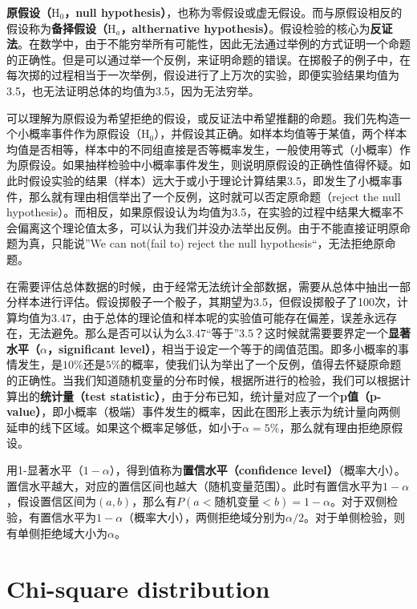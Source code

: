 \documentclass[11pt]{article}
\begin{document}
\textbf{原假设（$\text{H}_0$，null hypothesis）}，也称为零假设或虚无假设。而与原假设相反的假设称为\textbf{备择假设（$\text{H}_a$，althernative hypothesis）}。假设检验的核心为\textbf{反证法}。在数学中，由于不能穷举所有可能性，因此无法通过举例的方式证明一个命题的正确性。但是可以通过举一个反例，来证明命题的错误。在掷骰子的例子中，在每次掷的过程相当于一次举例，假设进行了上万次的实验，即便实验结果均值为3.5，也无法证明总体的均值为3.5，因为无法穷举。

可以理解为原假设为希望拒绝的假设，或反证法中希望推翻的命题。我们先构造一个小概率事件作为原假设（$\text{H}_0$），并假设其正确。如样本均值等于某值，两个样本均值是否相等，样本中的不同组直接是否等概率发生，一般使用等式（小概率）作为原假设。如果抽样检验中小概率事件发生，则说明原假设的正确性值得怀疑。如此时假设实验的结果（样本）远大于或小于理论计算结果3.5，即发生了小概率事件，那么就有理由相信举出了一个反例，这时就可以否定原命题（reject the null hypothesis）。而相反，如果原假设认为均值为3.5，在实验的过程中结果大概率不会偏离这个理论值太多，可以认为我们并没办法举出反例。由于不能直接证明原命题为真，只能说”We can not(fail to) reject the null hypothesis“，无法拒绝原命题。

在需要评估总体数据的时候，由于经常无法统计全部数据，需要从总体中抽出一部分样本进行评估。假设掷骰子一个骰子，其期望为3.5，但假设掷骰子了100次，计算均值为3.47，由于总体的理论值和样本呢的实验值可能存在偏差，误差永远存在，无法避免。那么是否可以认为么3.47“等于”3.5？这时候就需要要界定一个\textbf{显著水平（$\alpha$，significant level）}，相当于设定一个等于的阈值范围。即多小概率的事情发生，是$10\%$还是$5\%$的概率，使我们认为举出了一个反例，值得去怀疑原命题的正确性。当我们知道随机变量的分布时候，根据所进行的检验，我们可以根据计算出的\textbf{统计量（test statistic）}，由于分布已知，统计量对应了一个\textbf{p值（p-value）}，即小概率（极端）事件发生的概率，因此在图形上表示为统计量向两侧延申的线下区域。如果这个概率足够低，如小于$\alpha=5\%$，那么就有理由拒绝原假设。

用1-显著水平（$1-\alpha$），得到值称为\textbf{置信水平（confidence level）}（概率大小）。置信水平越大，对应的置信区间也越大（随机变量范围）。此时有置信水平为$1-\alpha$，假设置信区间为$(a,b)$，那么有$P(a<\text{随机变量}<b)=1-\alpha$。对于双侧检验，有置信水平为$1-\alpha$（概率大小），两侧拒绝域分别为$\alpha/2$。对于单侧检验，则有单侧拒绝域大小为$\alpha$。

\section{Chi-square distribution}
\end{document}
